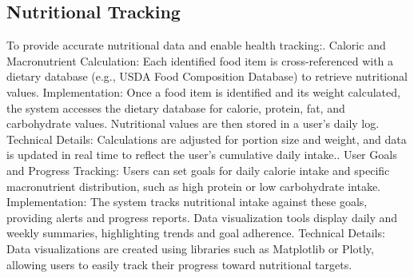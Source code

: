 \documentclass[conference]{IEEEtran}
\begin{document}
\subsection{Nutritional Tracking}
To provide accurate nutritional data and enable health tracking:. Caloric and Macronutrient Calculation:\newline
         Each identified food item is cross-referenced with a dietary database (e.g., USDA Food Composition Database) to retrieve nutritional values.
         Implementation: Once a food item is identified and its weight calculated, the system accesses the dietary database for calorie, protein, fat, and carbohydrate values. Nutritional values are then stored in a user’s daily log.\newline
         Technical Details: Calculations are adjusted for portion size and weight, and data is updated in real time to reflect the user’s cumulative daily intake.. User Goals and Progress Tracking:\newline
         Users can set goals for daily calorie intake and specific macronutrient distribution, such as high protein or low carbohydrate intake.\newline
         Implementation: The system tracks nutritional intake against these goals, providing alerts and progress reports. Data visualization tools display daily and weekly summaries, highlighting trends and goal adherence.\newline
         Technical Details: Data visualizations are created using libraries such as Matplotlib or Plotly, allowing users to easily track their progress toward nutritional targets.\newline
\end{document}
